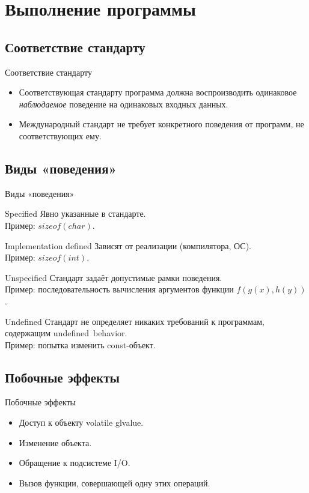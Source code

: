 \documentclass[xetex,mathserif,serif,10pt]{beamer}
\begin{document}
    \section{Выполнение программы}
    \subsection{Соответствие стандарту}
    \begin{frame}{Соответствие стандарту}
        \begin{itemize}
            \item Соответствующая стандарту программа должна воспроизводить одинаковое \textit{наблюдаемое} поведение
                на одинаковых входных данных.
            \item Международный стандарт не требует конкретного поведения от программ, не соответствующих ему.
        \end{itemize}
    \end{frame}
    \subsection{Виды «поведения»}
    \begin{frame}{Виды «поведения»}
        \begin{block}{Specified}
            Явно указанные в стандарте. \\
            Пример: $sizeof(char)$.
        \end{block}
        \begin{block}{Implementation defined}
            Зависят от реализации (компилятора, ОС). \\
            Пример: $sizeof(int)$.
        \end{block}
        \begin{block}{Unspecified}
            Стандарт задаёт допустимые рамки поведения. \\
            Пример: последовательность вычисления аргументов функции $f(g(x), h(y))$.
        \end{block}
        \begin{block}{Undefined}
            Стандарт не определяет никаких требований к программам, содержащим undefined~behavior. \\
            Пример: попытка изменить const-объект.
        \end{block}
    \end{frame}
    \subsection{Побочные эффекты}
    \begin{frame}{Побочные эффекты}
        \begin{itemize}
            \item Доступ к объекту volatile glvalue.
            \item Изменение объекта.
            \item Обращение к подсистеме I/O.
            \item Вызов функции, совершающей одну этих операций.
        \end{itemize}
    \end{frame}
\end{document}
